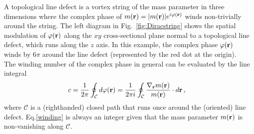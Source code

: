 A topological line defect is a vortex string of the mass parameter in three dimensions where the complex phase of $m({\bf r})=|m({\bf r})|e^{i\varphi({\bf r})}$ winds non-trivially around the string. The left diagram in Fig.~\ref{fig:Diracstring} shows the spatial modulation of $\varphi({\bf r})$ along the $xy$ cross-sectional plane normal to a topological line defect, which runs along the $z$ axis. In this example, the complex phase $\varphi({\bf r})$ winds by $6\pi$ around the line defect (represented by the red dot at the origin). The winding number of the complex phase in general can be evaluated by the line integral \begin{align}c=\frac{1}{2\pi}\oint_\mathcal{C}d\varphi({\bf r})=\frac{1}{2\pi i}\oint_\mathcal{C}\frac{\nabla_{\bf r}m({\bf r})}{m({\bf r})}\cdot d{\bf r} \,, \label{winding}\end{align} where $\mathcal{C}$ is a (righthanded) closed path that runs once around the (oriented) line defect. Eq.\eqref{winding} is always an integer given that the mass parameter $m({\bf r})$ is non-vanishing along $\mathcal{C}$.

